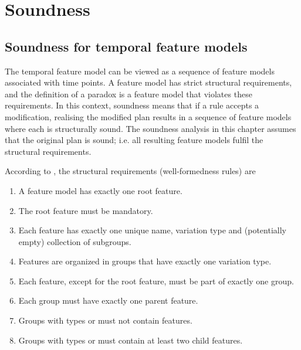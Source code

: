 \chapter{Soundness}
\label{cha:soundness}


\section{Soundness for temporal feature models}
\label{sec:soundness-for-temporal-feature-models}
The temporal feature model can be viewed as a sequence of feature models associated with time points. A feature model has strict structural requirements, and the definition of a paradox is a feature model that violates these requirements. In this context, soundness means that if a rule accepts a modification, realising the modified plan results in a sequence of feature models where each is structurally sound. The soundness analysis in this chapter assumes that the original plan is sound; i.e. all resulting feature models fulfil the structural requirements. 

According to \cite{art:consistency-preserving-evolution-planning}, the structural requirements (well-formedness rules) are 
\begin{enumerate}[\itbf{WF\arabic*}, itemsep=0mm]
   \item A feature model has exactly one root feature.
   \item The root feature must be mandatory.
   \item Each feature has exactly one unique name, variation type and (potentially empty) collection of subgroups.
   \item Features are organized in groups that have exactly one variation type.
   \item Each feature, except for the root feature, must be part of exactly one group.
   \item Each group must have exactly one parent feature.
   \item Groups with types \xortype{} or \ortype{} must not contain \mandatory{} features.
   \item Groups with types \xortype{} or \ortype{} must contain at least two child features.
\end{enumerate}

